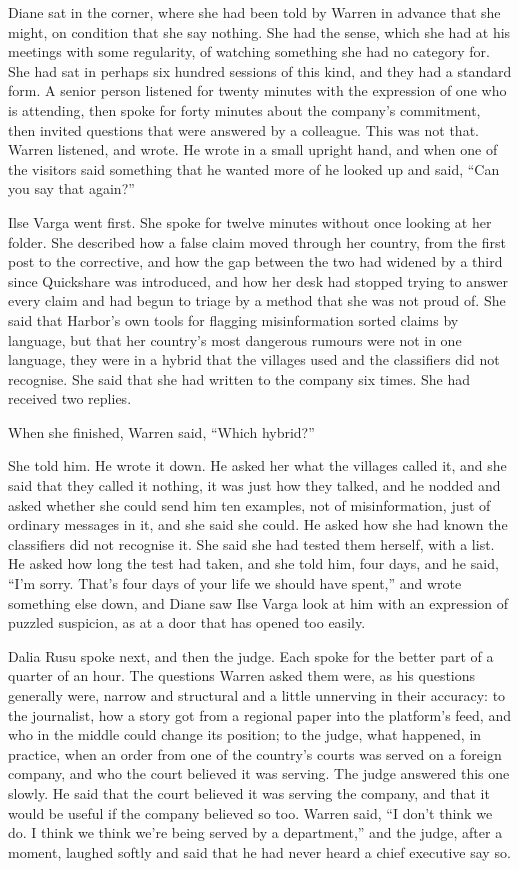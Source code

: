 Diane sat in the corner, where she had been told by Warren in advance that she might, on condition that she say nothing. She had the sense, which she had at his meetings with some regularity, of watching something she had no category for. She had sat in perhaps six hundred sessions of this kind, and they had a standard form. A senior person listened for twenty minutes with the expression of one who is attending, then spoke for forty minutes about the company's commitment, then invited questions that were answered by a colleague. This was not that. Warren listened, and wrote. He wrote in a small upright hand, and when one of the visitors said something that he wanted more of he looked up and said, ``Can you say that again?''

Ilse Varga went first. She spoke for twelve minutes without once looking at her folder. She described how a false claim moved through her country, from the first post to the corrective, and how the gap between the two had widened by a third since Quickshare was introduced, and how her desk had stopped trying to answer every claim and had begun to triage by a method that she was not proud of. She said that Harbor's own tools for flagging misinformation sorted claims by language, but that her country's most dangerous rumours were not in one language, they were in a hybrid that the villages used and the classifiers did not recognise. She said that she had written to the company six times. She had received two replies.

When she finished, Warren said, ``Which hybrid?''

She told him. He wrote it down. He asked her what the villages called it, and she said that they called it nothing, it was just how they talked, and he nodded and asked whether she could send him ten examples, not of misinformation, just of ordinary messages in it, and she said she could. He asked how she had known the classifiers did not recognise it. She said she had tested them herself, with a list. He asked how long the test had taken, and she told him, four days, and he said, ``I'm sorry. That's four days of your life we should have spent,'' and wrote something else down, and Diane saw Ilse Varga look at him with an expression of puzzled suspicion, as at a door that has opened too easily.

Dalia Rusu spoke next, and then the judge. Each spoke for the better part of a quarter of an hour. The questions Warren asked them were, as his questions generally were, narrow and structural and a little unnerving in their accuracy: to the journalist, how a story got from a regional paper into the platform's feed, and who in the middle could change its position; to the judge, what happened, in practice, when an order from one of the country's courts was served on a foreign company, and who the court believed it was serving. The judge answered this one slowly. He said that the court believed it was serving the company, and that it would be useful if the company believed so too. Warren said, ``I don't think we do. I think we think we're being served by a department,'' and the judge, after a moment, laughed softly and said that he had never heard a chief executive say so.

